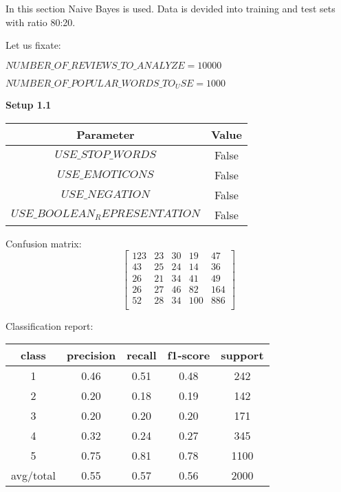 \documentclass[12pt]{report}
\begin{document}
In this section Naive Bayes is used. Data is devided into training and test sets with ratio 80:20.

Let us fixate:

$NUMBER\_OF\_REVIEWS\_TO\_ANALYZE = 10000$

$NUMBER\_OF\_POPULAR\_WORDS\_TO_USE = 1000$

\bigbreak

\textbf{Setup 1.1}

\begin{center}
	\begin{tabular}{ c | c }
		\hline
		Parameter & Value \\ \hline
		$USE\_STOP\_WORDS$ & False \\ \hline
		$USE\_EMOTICONS$ & False \\ \hline
		$USE\_NEGATION$ & False \\ \hline
		$USE\_BOOLEAN_REPRESENTATION$ & False \\ \hline
	\end{tabular}
\end{center}

Confusion matrix:
\[
\begin{bmatrix}
123 & 23 & 30 & 19 & 47 \\
43 & 25 & 24 & 14 & 36 \\
26 & 21 & 34 & 41 & 49 \\
26 & 27 & 46 & 82 & 164 \\
52 & 28 & 34 & 100 & 886 \\
\end{bmatrix}
\]

Classification report:

\begin{center}
	\begin{tabular}{c | c | c | c | c }
		\hline
		class & precision & recall & f1-score & support \\ \hline
		1 & 0.46 & 0.51 & 0.48 & 242 \\ \hline
		2 & 0.20 & 0.18 & 0.19 & 142 \\ \hline
		3 & 0.20 & 0.20 & 0.20 & 171 \\ \hline
		4 & 0.32 & 0.24 & 0.27 & 345 \\ \hline
		5 & 0.75 & 0.81 & 0.78 & 1100 \\ \hline
		avg/total & 0.55 & 0.57 & 0.56 & 2000 \\ \hline
	\end{tabular}
\end{center}
\end{document}
